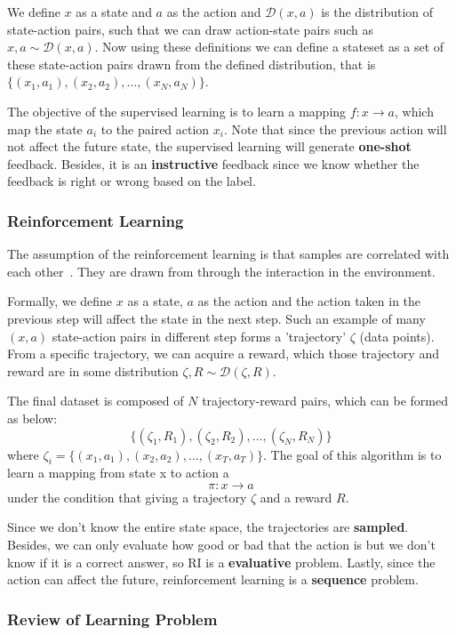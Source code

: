 \documentclass[11pt]{article}
\begin{document}
We define $x$ as a state and $a$ as the action and $\mathcal{D} (x,a)$ is the distribution of state-action pairs, such that we can draw action-state pairs such as $x, a \sim \mathcal{D} (x,a) $.
%
Now using these definitions we can define a stateset as a set of these state-action pairs drawn from the defined distribution, that is $\{ (x_1, a_1), (x_2, a_2), \dots, (x_N, a_N) \}$.

The objective of the supervised learning is to learn a mapping $f: x\rightarrow a$, which map the state $a_i$ to the paired action $x_i$. Note that since the previous action will not affect the future state, the supervised learning will generate \textbf{one-shot} feedback. Besides, it is an \textbf{instructive} feedback since we know whether the feedback is right or wrong based on the label.

\subsubsection{Reinforcement Learning}

The assumption of the reinforcement learning is that samples are correlated with each other~\cite{sutton2018reinforcement}. They are drawn from through the interaction in the environment.

Formally, we define $x$ as a state, $a$ as the action and the action taken in the previous step will affect the state in the next step. Such an example of many $(x, a)$ state-action pairs in different step forms a 'trajectory' $\zeta$ (data points). From a specific trajectory, we can acquire a reward, which those trajectory and reward are in some distribution $\zeta, R \sim \mathcal{D}(\zeta, R)$.

The final dataset is composed of $N$ trajectory-reward pairs, which can be formed as below:
$$\{ (\zeta_1, R_1), (\zeta_2, R_2), \dots, (\zeta_N, R_N) \}$$
where $\zeta_i = \{ (x_1, a_1), (x_2, a_2), \dots, (x_T, a_T) \}$.
%
The goal of this algorithm is to learn a mapping from state x to action a 
$$\pi : x \rightarrow a$$
under the condition that giving a trajectory $\zeta$ and a reward $R$.

Since we don't know the entire state space, the trajectories are \textbf{sampled}. Besides, we can only evaluate how good or bad that the action is but we don't know if it is a correct answer, so RI is a \textbf{evaluative} problem. Lastly, since the action can affect the future, reinforcement learning is a \textbf{sequence} problem.


\subsubsection{Review of Learning Problem}
\end{document}
